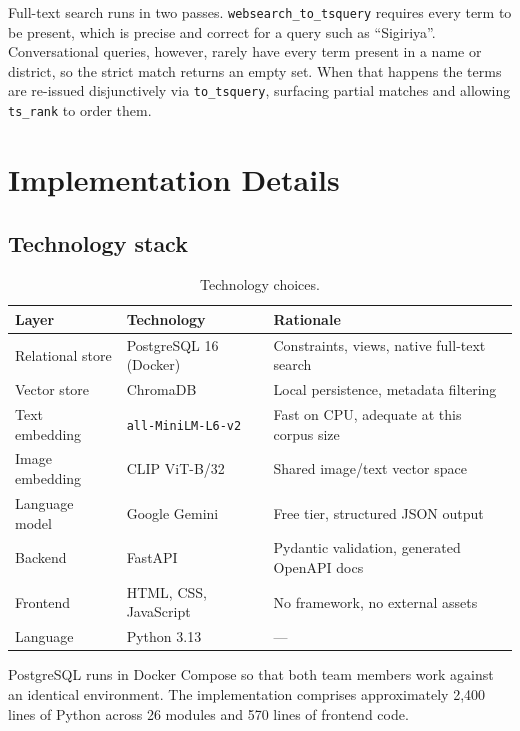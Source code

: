 \documentclass[11pt,a4paper]{article}
\begin{document}
Full-text search runs in two passes. \texttt{websearch\_to\_tsquery} requires
every term to be present, which is precise and correct for a query such as
``Sigiriya''. Conversational queries, however, rarely have every term present in
a name or district, so the strict match returns an empty set. When that happens
the terms are re-issued disjunctively via \texttt{to\_tsquery}, surfacing
partial matches and allowing \texttt{ts\_rank} to order them.

\section{Implementation Details}

\subsection{Technology stack}

\begin{table}[h]
\centering
\small
\begin{tabular}{lll}
\toprule
\textbf{Layer} & \textbf{Technology} & \textbf{Rationale} \\
\midrule
Relational store & PostgreSQL 16 (Docker) & Constraints, views, native full-text search \\
Vector store     & ChromaDB               & Local persistence, metadata filtering \\
Text embedding   & \texttt{all-MiniLM-L6-v2} & Fast on CPU, adequate at this corpus size \\
Image embedding  & CLIP ViT-B/32          & Shared image/text vector space \\
Language model   & Google Gemini          & Free tier, structured JSON output \\
Backend          & FastAPI                & Pydantic validation, generated OpenAPI docs \\
Frontend         & HTML, CSS, JavaScript  & No framework, no external assets \\
Language         & Python 3.13            & --- \\
\bottomrule
\end{tabular}
\caption{Technology choices.}
\end{table}

PostgreSQL runs in Docker Compose so that both team members work against an
identical environment. The implementation comprises approximately 2{,}400 lines
of Python across 26 modules and 570 lines of frontend code.
\end{document}
